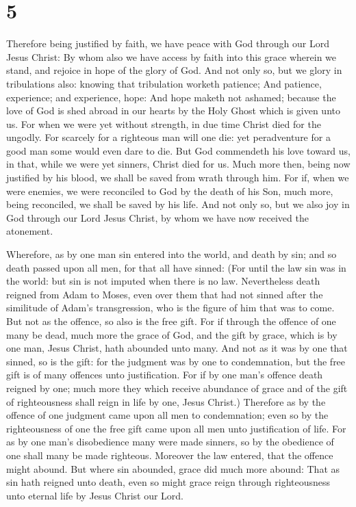 \hypertarget{section-4}{%
\section{5}\label{section-4}}

 Therefore being justified by faith, we have peace with God
through our Lord Jesus Christ:  By whom also we have access
by faith into this grace wherein we stand, and rejoice in hope of the
glory of God.  And not only so, but we glory in tribulations
also: knowing that tribulation worketh patience;  And
patience, experience; and experience, hope:  And hope maketh
not ashamed; because the love of God is shed abroad in our hearts by the
Holy Ghost which is given unto us.  For when we were yet
without strength, in due time Christ died for the ungodly. 
For scarcely for a righteous man will one die: yet peradventure for a
good man some would even dare to die.  But God commendeth
his love toward us, in that, while we were yet sinners, Christ died for
us.  Much more then, being now justified by his blood, we
shall be saved from wrath through him.  For if, when we
were enemies, we were reconciled to God by the death of his Son, much
more, being reconciled, we shall be saved by his life.  And
not only so, but we also joy in God through our Lord Jesus Christ, by
whom we have now received the atonement.

 Wherefore, as by one man sin entered into the world, and
death by sin; and so death passed upon all men, for that all have
sinned:  (For until the law sin was in the world: but sin
is not imputed when there is no law.  Nevertheless death
reigned from Adam to Moses, even over them that had not sinned after the
similitude of Adam's transgression, who is the figure of him that was to
come.  But not as the offence, so also is the free gift.
For if through the offence of one many be dead, much more the grace of
God, and the gift by grace, which is by one man, Jesus Christ, hath
abounded unto many.  And not as it was by one that sinned,
so is the gift: for the judgment was by one to condemnation, but the
free gift is of many offences unto justification.  For if
by one man's offence death reigned by one; much more they which receive
abundance of grace and of the gift of righteousness shall reign in life
by one, Jesus Christ.)  Therefore as by the offence of one
judgment came upon all men to condemnation; even so by the righteousness
of one the free gift came upon all men unto justification of life.
 For as by one man's disobedience many were made sinners,
so by the obedience of one shall many be made righteous. 
Moreover the law entered, that the offence might abound. But where sin
abounded, grace did much more abound:  That as sin hath
reigned unto death, even so might grace reign through righteousness unto
eternal life by Jesus Christ our Lord.

